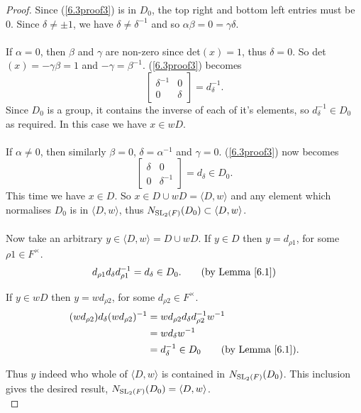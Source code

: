\begin{proof}
        Since (\ref{6.3proof3}) is in $D_0$, the top right and bottom left entries must be 0. Since  $\delta \neq \pm 1$, we have $\delta \neq \delta^{-1}$ and so $\alpha \beta = 0 = \gamma \delta$. \\
        \\
         \space If $\alpha = 0$, then $\beta$ and $\gamma$ are non-zero since det$(x) = 1$, thus $\delta = 0$. So det$(x) = - \gamma \beta = 1$  and $- \gamma = \beta^{-1}$. (\ref{6.3proof3}) becomes $$\begin{bmatrix} \delta^{-1} & 0 \\ 0 & \delta \end{bmatrix} = d^{-1}_\delta.$$Since $D_0$ is a group, it contains the inverse of each of it's elements, so $d^{-1}_\delta \in D_0$ as required. In this case we have $x \in wD$. \\
        \\
         \space If $\alpha \neq 0$, then similarly $\beta = 0$, $\delta = \alpha^{-1}$ and $\gamma = 0$. (\ref{6.3proof3}) now becomes $$\begin{bmatrix} \delta & 0 \\ 0 & \delta^{-1} \end{bmatrix} = d_\delta \in D_0.$$This time we have $x \in D$. So $x \in D \cup wD = \langle D , w \rangle$ and any element which normalises $D_0$ is in $\langle D , w \rangle$, thus $N_{\operatorname{SL}_2(F)}(D_0) \subset \langle D , w \rangle$. \\
        \\
        Now take an arbitrary $y \in \langle D , w \rangle = D \cup wD$. If $y \in D$ then $y = d_{\rho 1}$, for some $\rho 1 \in F^\times$.
        \begin{align*} d_{\rho 1} d_\delta d^{-1}_{\rho 1} = d_\delta \in D_0. \tag{by Lemma \ref{6.1}}
        \end{align*}
        
        If $y \in wD$ then $y = w d_{\rho 2}$, for some $ d_{\rho 2} \in F^\times$.
        \begin{align*} (w d_{\rho 2}) d_\delta (w d_{\rho 2})^{-1} &= w d_{\rho 2} d_\delta d^{-1}_{\rho 2} w^{-1}
        \\ &= w d_\delta w^{-1}
        \\ &= d^{-1}_\delta \in D_0 \tag{by Lemma \ref{6.1}}.
        \end{align*}
        
        Thus $y$ indeed who whole of $\langle D , w \rangle$ is contained in $N_{\operatorname{SL}_2(F)}(D_0)$. This inclusion gives the desired result, $N_{\operatorname{SL}_2(F)}(D_0) = \langle D , w \rangle$. \\
        
        \end{proof}

